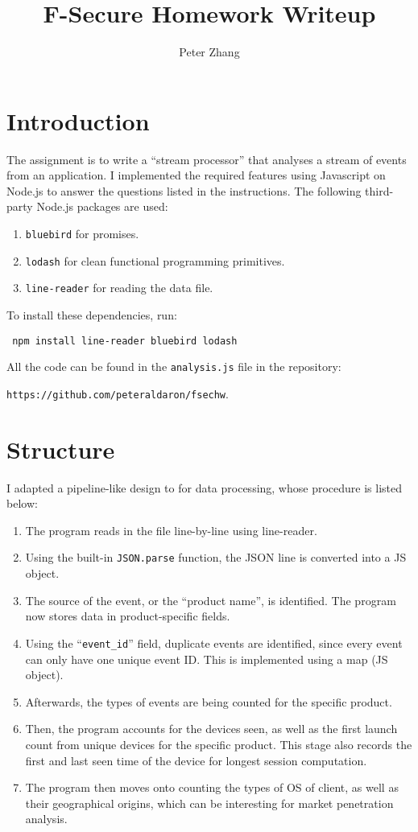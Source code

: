 \documentclass[12pt,letter]{article}
\newcommand{\be}{\begin{enumerate}}
\newcommand{\ee}{\end{enumerate}}
\begin{document}
  \title{F-Secure Homework Writeup}
  \author{Peter Zhang}
  \maketitle
  \section{Introduction}
  The assignment is to write a ``stream processor'' that analyses a stream of
  events from an application. I implemented the required features using
  Javascript on Node.js to answer the questions listed in the instructions. The
  following third-party Node.js packages are used:
  \be
  \item \texttt{bluebird} for promises.
  \item \texttt{lodash} for clean functional programming primitives.
  \item \texttt{line-reader} for reading the data file.
  \ee
  To install these dependencies, run:
  \begin{center}
      \texttt{
      npm install line-reader bluebird lodash
        }
  \end{center}

  All the code can be found in the \texttt{analysis.js} file in the repository:
  \begin{center}
  \texttt{https://github.com/peteraldaron/fsechw}.
  \end{center}

  \section{Structure}
  I adapted a pipeline-like design to for data processing, whose procedure is
  listed below:
  \be
  \item The program reads in the file line-by-line using line-reader.
  \item Using the built-in \texttt{JSON.parse} function, the JSON line is
      converted into a JS object.
  \item The source of the event, or the ``product name'', is identified. The
      program now stores data in product-specific fields.
  \item Using the ``\texttt{event\_id}'' field, duplicate events are identified,
      since every event can only have one unique event ID. This is implemented
      using a map (JS object).
  \item Afterwards, the types of events are being counted for the specific
      product.
  \item Then, the program accounts for the devices seen, as well as the first
      launch count from unique devices for the specific product. This stage also
      records the first and last seen time of the device for longest session
      computation.
  \item The program then moves onto counting the types of OS of client, as well
      as their geographical origins, which can be interesting for market
      penetration analysis.
  \ee
\end{document}
